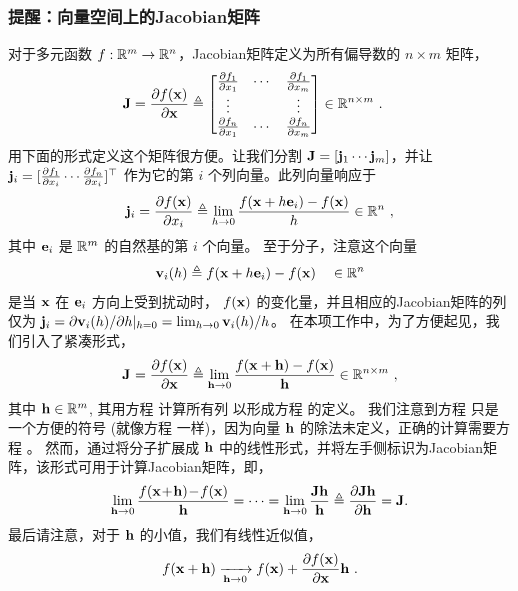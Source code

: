 \subsubsection[Jacobians on vector spaces]{提醒：向量空间上的Jacobian矩阵}

对于多元函数 $f:{\mathbb R}^m\to{\mathbb R}^n$，Jacobian矩阵定义为所有偏导数的 $n\times m$ 矩阵， 
%
\begin{align}\label{equ:jac_Rn_matrix}
{\bf J} = \frac{\partial f({\bf x})}{\partial{\bf x}} &\triangleq \begin{bmatrix}
\frac{\partial f_1}{\partial x_1} & \cdots & \frac{\partial f_1}{\partial x_m} \\
\vdots && \vdots \\
\frac{\partial f_n}{\partial x_1} & \cdots & \frac{\partial f_n}{\partial x_m} 
\end{bmatrix} \in{\mathbb R}^{n\times m}
~.
\end{align}
%
用下面的形式定义这个矩阵很方便。让我们分割 ${\bf J}=[{\bf j}_1\cdots{\bf j}_m]$，并让 ${\bf j}_i=[\frac{\partial f_1}{\partial x_i}\cdots\frac{\partial f_n}{\partial x_i}]^{\top}$ 作为它的第 $i$ 个列向量。此列向量响应于
%
\begin{align}\label{equ:jac_Rn_i}
{\bf j}_i = \frac{\partial f({\bf x})}{\partial x_i} \triangleq \lim_{h\to0}\frac{f({\bf x}+h{\bf e}_i)-f({\bf x})}{h} \in {\mathbb R}^n
~,
\end{align}
%
其中 ${\bf e}_i$ 是 ${\mathbb R}^m$ 的自然基的第 $i$ 个向量。
至于分子，注意这个向量 
%
\begin{align}\label{equ:jac_Rn_vec}
{\bf v}_i(h) \triangleq f({\bf x}+h{\bf e}_i)-f({\bf x}) \quad \in{\mathbb R}^n
\end{align}
%
是当 ${\bf x}$ 在 ${\bf e}_i$ 方向上受到扰动时， $f({\bf x})$ 的变化量，并且相应的Jacobian矩阵的列仅为 ${\bf j}_i=\partial{\bf v}_i(h)/\partial h|_{h=0}=\lim_{h\to0}{\bf v}_i(h)/h$。
在本项工作中，为了方便起见，我们引入了紧凑形式，
%
\begin{align}\label{equ:jac_Rn}
{{\bf J}^{}_{}}=\frac{\partial f({\bf x})}{\partial{\bf x}}\triangleq\lim_{{\bf h}\to0}\frac{f({\bf x}+{\bf h})-f({\bf x})}{{\bf h}}
\in{\mathbb R}^{n\times m}
~,
\end{align}
%
其中 ${\bf h}\in{\mathbb R}^m$, 其用方程  计算所有列
以形成方程  的定义。
我们注意到方程  只是一个方便的符号 (就像方程  一样)，因为向量 ${\bf h}$ 的除法未定义，正确的计算需要方程  。
然而，通过将分子扩展成 ${\bf h}$ 中的线性形式，并将左手侧标识为Jacobian矩阵，该形式可用于计算Jacobian矩阵，即，
%
\begin{align}\label{equ:jac_Rn_identify}
 \lim_{{\bf h}\to0}\frac{f({\bf x}\!+\!{\bf h})\!-\!f({\bf x})}{{\bf h}} 
 = \cdots
 = \lim_{{\bf h}\to0}\frac{{\bf J}{\bf h}}{{\bf h}}  
 \triangleq \frac{\partial{\bf J}{\bf h}}{\partial{\bf h}} 
 = {\bf J}.
\end{align}
%
最后请注意，对于 ${\bf h}$ 的小值，我们有线性近似值，
%
\begin{align}
f({\bf x}+{\bf h}) \xrightarrow[{\bf h}\to0]{} f({\bf x}) + \frac{\partial f({\bf x})}{\partial{\bf x}}{\bf h}
~.
\end{align}

